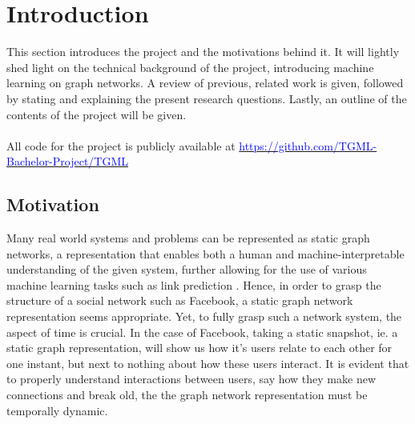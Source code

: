 \section{Introduction}
\label{sec:Intro}

This section introduces the project and the motivations behind it.
It will lightly shed light on the technical background of the project, introducing machine learning on graph networks.
A review of previous, related work is given, followed by stating and explaining the present research questions.
Lastly, an outline of the contents of the project will be given.
\\\\
All code for the project is publicly available at \href{https://github.com/TGML-Bachelor-Project/TGML}{\textcolor{blue}{https://github.com/TGML-Bachelor-Project/TGML}}


\subsection{Motivation}
\label{sec:Intro:Motivation}
Many real world systems and problems can be represented as static graph networks, a representation that enables both a human and machine-interpretable understanding of the given system, further allowing for the use of various machine learning tasks such as link prediction 
.
Hence, in order to grasp the structure of a social network such as Facebook, a static graph network representation seems appropriate.
Yet, to fully grasp such a network system, the aspect of time is crucial.
In the case of Facebook, taking a static snapshot, ie. a static graph representation, will show us how it's users relate to each other for one instant, but next to nothing about how these users interact.
It is evident that to properly understand interactions between users, say how they make new connections and break old, the the graph network representation must be temporally dynamic.


